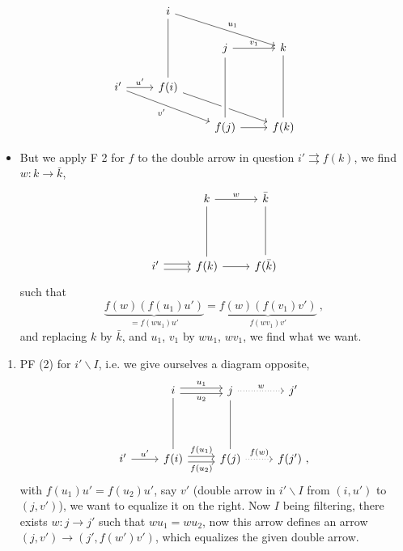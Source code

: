 \documentclass[11pt]{article}
\newcommand{\printedpage}[1]{\marginpar{\footnotesize p.~#1}}
\newcommand{\msp}[1]{\marginpar{\footnotesize [#1]}}
\newcommand{\bs}{\backslash}
\begin{document}
\printedpage{84}

\[
\begin{tikzcd}
{} & i \arrow[drr, "u_1"] \arrow[dd, dash] & {} & {} \\
{} & {} & j \arrow[r, "v_1"] & k \arrow[dd, dash] \\
i' \arrow[r, "u'"] \arrow[drr, "v'"'] & f(i) \arrow[drr] & {} & {} \\
{} & {} & f(j) \arrow[r] \arrow[uu, dash, crossing over] & f(k)
\end{tikzcd}
\]

\begin{itemize}[label={}]
\item \msp{page 229}But we apply F 2 for $f$ to the double arrow in question $i' \rightrightarrows f(k)$, we find $w : k \longrightarrow \bar{k}$,
\[
\begin{tikzcd}
{} & k \arrow[r, "w"] \arrow[dd, dash] & \bar{k} \arrow[dd, dash] \\
{} & {} & {} \\
i' \arrow[r, shift left] \arrow[r, shift right] & f(k) \arrow[r] & f(\bar{k})
\end{tikzcd}
\]
such that
\[
\underbrace{f(w)(f(u_1)u')}_{= f(wu_1)u'} = \underbrace{f(w)(f(v_1)v')}_{f(wv_1)v'} \ ,
\]
and replacing $k$ by $\bar{k}$, and $u_1$, $v_1$ by $wu_1$, $wv_1$, we find what we want.
\end{itemize}

\begin{enumerate}[label=\arabic*), start=2]
\item PF (2) for $i'\bs I$, i.e. we give ourselves a diagram opposite,
\[
\begin{tikzcd}
{} & i \arrow[r, shift left, "u_1"] \arrow[r, shift right, "u_2"'] \arrow[dd, dash] & j \arrow[r, dotted, "w"] \arrow[dd, dash] & j' \\
{} & {} & {} & {} \\
i' \arrow[r, "u'"] & f(i) \arrow[r, shift left, "f(u_1)"] \arrow[r, shift right, "f(u_2)"'] & f(j) \arrow[r, dotted, "f(w)"] & f(j') \ ,
\end{tikzcd}
\]
with $f(u_1)u' = f(u_2)u'$, say $v'$ (double arrow in $i'\bs I$ from $(i,u')$ to $(j,v')$), we want to equalize it on the right. Now $I$ being filtering, there exists $w : j \longrightarrow j'$ such that $wu_1 = wu_2$, now this arrow defines an arrow $(j,v') \longrightarrow (j', f(w')v')$, which equalizes the given double arrow. %
\end{enumerate}
\end{document}
